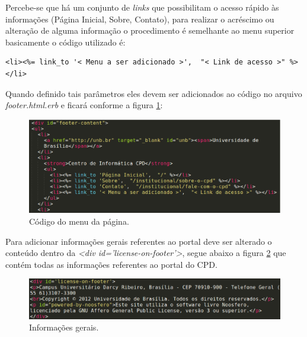 Percebe-se que há um conjunto de \emph{links} que possibilitam o acesso rápido às informações (Página Inicial, Sobre, Contato), para realizar o acréscimo ou alteração de alguma informação o procedimento é semelhante ao menu superior basicamente o código utilizado é:

\begin{lstlisting}
<li><%= link_to '< Menu a ser adicionado >',  "< Link de acesso >" %></li>
\end{lstlisting}

Quando definido tais parâmetros eles devem ser adicionados ao código no arquivo \emph{footer.html.erb} e ficará conforme a figura \ref{fig:codMenu}:

\begin{figure}[h]
     \centering
       \includegraphics[keepaspectratio=true,scale=0.49]{figuras/footerMenu.eps}
     \caption{Código do menu da página.}
     \label{fig:codMenu}
\end{figure}

Para adicionar informações gerais referentes ao portal deve ser alterado o conteúdo dentro da \emph{<div id='license-on-footer'>}, segue abaixo a figura \ref{fig:infGeral} que contém todas as informações referentes ao portal do CPD.

\begin{figure}[h]
     \centering
       \includegraphics[keepaspectratio=true,scale=0.49]{figuras/informacoesGeraisRodape.eps}
     \caption{Informações gerais.}
     \label{fig:infGeral}
\end{figure}
